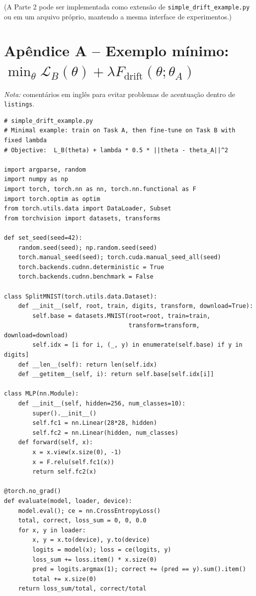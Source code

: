 \documentclass[9pt,a4paper]{extarticle}
\begin{document}
(A Parte 2 pode ser implementada como extensão de \texttt{simple\_drift\_example.py} ou em um arquivo próprio, mantendo a mesma interface de experimentos.)

\clearpage
\appendix
\section*{Apêndice A -- Exemplo mínimo: $\min_\theta \mathcal{L}_B(\theta)+\lambda F_{\text{drift}}(\theta;\theta_A)$}
\noindent
\textit{Nota:} comentários em inglês para evitar problemas de acentuação dentro de \texttt{listings}.

\begin{lstlisting}
# simple_drift_example.py
# Minimal example: train on Task A, then fine-tune on Task B with fixed lambda
# Objective:  L_B(theta) + lambda * 0.5 * ||theta - theta_A||^2

import argparse, random
import numpy as np
import torch, torch.nn as nn, torch.nn.functional as F
import torch.optim as optim
from torch.utils.data import DataLoader, Subset
from torchvision import datasets, transforms

def set_seed(seed=42):
    random.seed(seed); np.random.seed(seed)
    torch.manual_seed(seed); torch.cuda.manual_seed_all(seed)
    torch.backends.cudnn.deterministic = True
    torch.backends.cudnn.benchmark = False

class SplitMNIST(torch.utils.data.Dataset):
    def __init__(self, root, train, digits, transform, download=True):
        self.base = datasets.MNIST(root=root, train=train,
                                   transform=transform, download=download)
        self.idx = [i for i, (_, y) in enumerate(self.base) if y in digits]
    def __len__(self): return len(self.idx)
    def __getitem__(self, i): return self.base[self.idx[i]]

class MLP(nn.Module):
    def __init__(self, hidden=256, num_classes=10):
        super().__init__()
        self.fc1 = nn.Linear(28*28, hidden)
        self.fc2 = nn.Linear(hidden, num_classes)
    def forward(self, x):
        x = x.view(x.size(0), -1)
        x = F.relu(self.fc1(x))
        return self.fc2(x)

@torch.no_grad()
def evaluate(model, loader, device):
    model.eval(); ce = nn.CrossEntropyLoss()
    total, correct, loss_sum = 0, 0, 0.0
    for x, y in loader:
        x, y = x.to(device), y.to(device)
        logits = model(x); loss = ce(logits, y)
        loss_sum += loss.item() * x.size(0)
        pred = logits.argmax(1); correct += (pred == y).sum().item()
        total += x.size(0)
    return loss_sum/total, correct/total


\end{lstlisting}
\end{document}
